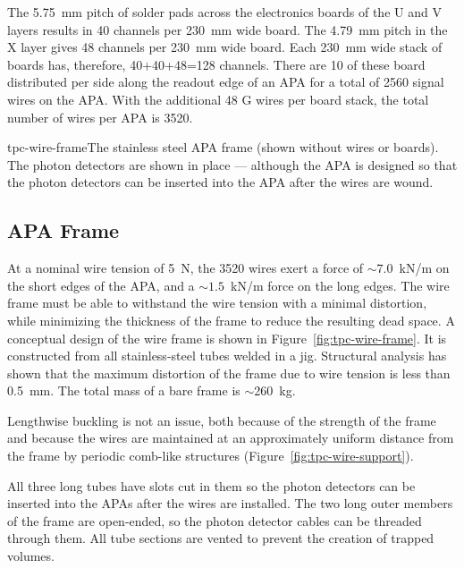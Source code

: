 The 5.75~mm pitch of solder pads across the electronics boards of the U and V layers results in 40 channels per 230~mm wide board.  The 4.79~mm pitch in the X layer gives 48 channels per 230~mm wide board.  Each 230~mm wide stack of boards has, therefore, 40+40+48=128 channels.  There are 10 of these board distributed per side along the readout edge of an APA for a total of 2560 signal wires on the APA.  With the additional 48 G wires per board stack, the total number of wires per APA is 3520.

\begin{cdrfigure}{tpc-wire-frame}{The stainless steel APA frame (shown without wires or boards). The photon detectors are shown in place --- although the APA is designed so that the photon detectors can be inserted into the APA after the wires are wound.}
\end{cdrfigure}


\subsection{APA Frame}
\label{subsec:fd-ref-apaframes}

At a nominal wire tension of 5~N, the 3520 wires exert a force of 
$\sim 7.0$~kN/m on the short edges of the APA, and a 
$\sim 1.5 $~kN/m force on the long edges. The wire 
frame must be able to withstand the wire tension with a minimal 
distortion, while minimizing the thickness of the 
frame to reduce the resulting dead space. A conceptual design 
of the wire frame is shown in Figure~\ref{fig:tpc-wire-frame}.  
It is constructed from all stainless-steel tubes welded in a jig.  
Structural analysis has shown that the maximum distortion of the frame due to wire tension is less than 0.5~mm. The total mass of a bare frame is $\sim$260~kg.

Lengthwise buckling is not an issue, both because of the strength of the frame and because the wires are maintained at an approximately uniform distance from the frame by periodic comb-like structures (Figure~\ref{fig:tpc-wire-support}).

All three long tubes have slots cut in them so the photon detectors can be inserted into the APAs after the wires are installed.  The two long outer members of the frame are open-ended, so the photon detector cables can be threaded through them.  All tube sections are vented to prevent the creation of trapped volumes.



